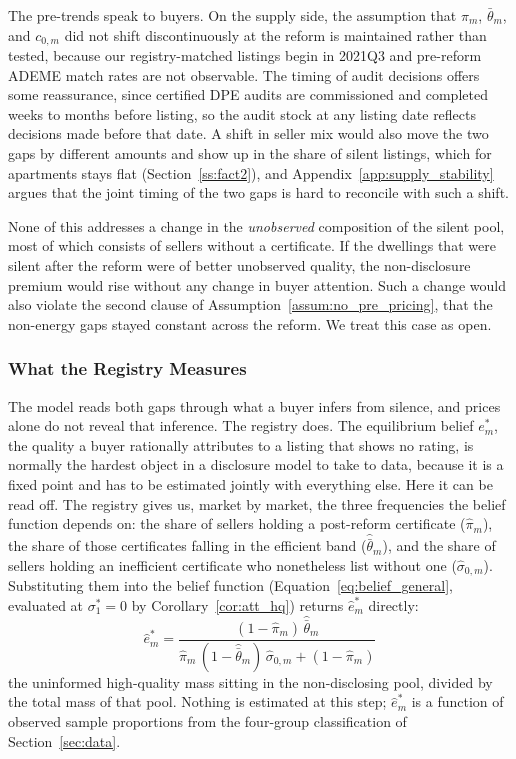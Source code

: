 The pre-trends speak to buyers. On the supply side, the assumption that $\pi_m$, $\bar\theta_m$, and $c_{0,m}$ did not shift discontinuously at the reform is maintained rather than tested, because our registry-matched listings begin in 2021Q3 and pre-reform ADEME match rates are not observable. The timing of audit decisions offers some reassurance, since certified DPE audits are commissioned and completed weeks to months before listing, so the audit stock at any listing date reflects decisions made before that date. A shift in seller mix would also move the two gaps by different amounts and show up in the share of silent listings, which for apartments stays flat (Section~\ref{ss:fact2}), and Appendix~\ref{app:supply_stability} argues that the joint timing of the two gaps is hard to reconcile with such a shift.

None of this addresses a change in the \emph{unobserved} composition of the silent pool, most of which consists of sellers without a certificate. If the dwellings that were silent after the reform were of better unobserved quality, the non-disclosure premium would rise without any change in buyer attention. Such a change would also violate the second clause of Assumption~\ref{assum:no_pre_pricing}, that the non-energy gaps stayed constant across the reform. We treat this case as open.

\subsubsection{What the Registry Measures}
\label{sec:beliefs}

The model reads both gaps through what a buyer infers from silence, and prices alone do not reveal that inference. The registry does. The equilibrium belief $e^*_m$, the quality a buyer rationally attributes to a listing that shows no rating, is normally the hardest object in a disclosure model to take to data, because it is a fixed point and has to be estimated jointly with everything else. Here it can be read off. The registry gives us, market by market, the three frequencies the belief function depends on: the share of sellers holding a post-reform certificate ($\hat\pi_m$), the share of those certificates falling in the efficient band ($\hat{\bar\theta}_m$), and the share of sellers holding an inefficient certificate who nonetheless list without one ($\hat\sigma_{0,m}$). Substituting them into the belief function (Equation~\eqref{eq:belief_general}, evaluated at $\sigma_1^*=0$ by Corollary~\ref{cor:att_hq}) returns $\hat e^*_m$ directly:
\begin{equation}
    \hat{e}^*_m = \frac{(1-\hat\pi_m)\,\hat{\bar\theta}_m}{\hat\pi_m\,(1-\hat{\bar\theta}_m)\,\hat\sigma_{0,m} + (1-\hat\pi_m)}
    \label{eq:estar}
\end{equation}
the uninformed high-quality mass sitting in the non-disclosing pool, divided by the total mass of that pool. Nothing is estimated at this step; $\hat e^*_m$ is a function of observed sample proportions from the four-group classification of Section~\ref{sec:data}.

